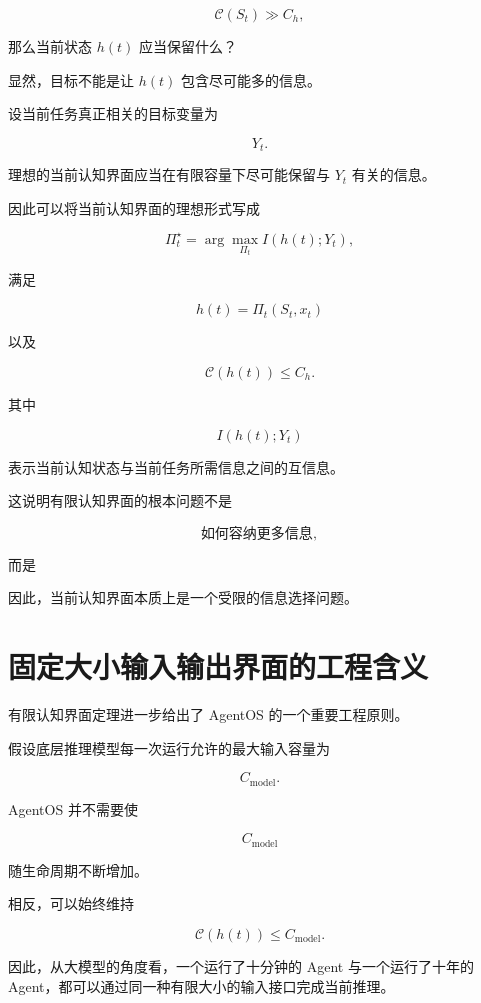 \[
\mathcal{C}(S_t)
\gg
C_h,
\]

那么当前状态 $h(t)$ 应当保留什么？

显然，目标不能是让 $h(t)$ 包含尽可能多的信息。

设当前任务真正相关的目标变量为

\[
Y_t.
\]

理想的当前认知界面应当在有限容量下尽可能保留与 $Y_t$ 有关的信息。

因此可以将当前认知界面的理想形式写成

\[
\Pi_t^\star
=
\arg\max_{\Pi_t}
I(h(t);Y_t),
\]

满足

\[
h(t)
=
\Pi_t(S_t,x_t)
\]

以及

\[
\mathcal{C}(h(t))
\leq
C_h.
\]

其中

\[
I(h(t);Y_t)
\]

表示当前认知状态与当前任务所需信息之间的互信息。

这说明有限认知界面的根本问题不是

\[
\text{如何容纳更多信息},
\]

而是

\begin{statementbox}
\centering
{}
\end{statementbox}

因此，当前认知界面本质上是一个受限的信息选择问题。


\section{固定大小输入输出界面的工程含义}

有限认知界面定理进一步给出了 AgentOS 的一个重要工程原则。

假设底层推理模型每一次运行允许的最大输入容量为

\[
C_{\mathrm{model}}.
\]

AgentOS 并不需要使

\[
C_{\mathrm{model}}
\]

随生命周期不断增加。

相反，可以始终维持

\[
\mathcal{C}(h(t))
\leq
C_{\mathrm{model}}.
\]

因此，从大模型的角度看，一个运行了十分钟的 Agent 与一个运行了十年的 Agent，都可以通过同一种有限大小的输入接口完成当前推理。


